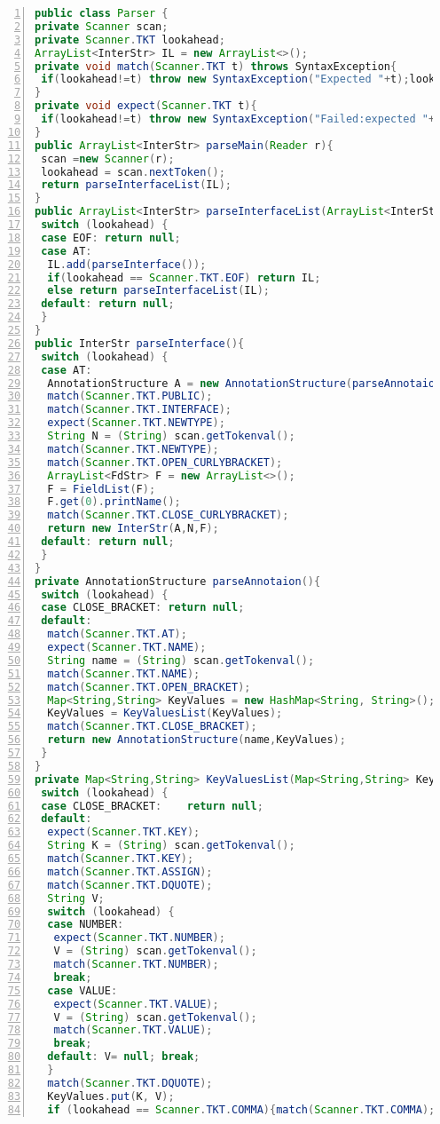 \documentclass[10pt]{report}
\begin{document}
\label{ParserClass}
\begin{lstlisting}[numbers=left,language=Java,frame=single,breaklines=true,label=Code:Mutual, caption=Parser Class.]
public class Parser {
private Scanner scan;
private Scanner.TKT lookahead;
ArrayList<InterStr> IL = new ArrayList<>();	
private void match(Scanner.TKT t) throws SyntaxException{
 if(lookahead!=t) throw new SyntaxException("Expected "+t);lookahead=scan.nextToken();
}
private void expect(Scanner.TKT t){
 if(lookahead!=t) throw new SyntaxException("Failed:expected "+t);
}
public ArrayList<InterStr> parseMain(Reader r){
 scan =new Scanner(r);
 lookahead = scan.nextToken();	
 return parseInterfaceList(IL);
}
public ArrayList<InterStr> parseInterfaceList(ArrayList<InterStr> IL){
 switch (lookahead) {
 case EOF: return null;
 case AT:
  IL.add(parseInterface());
  if(lookahead == Scanner.TKT.EOF) return IL;
  else return parseInterfaceList(IL);
 default: return null;
 }
}
public InterStr parseInterface(){
 switch (lookahead) {
 case AT:
  AnnotationStructure A = new AnnotationStructure(parseAnnotaion());
  match(Scanner.TKT.PUBLIC);
  match(Scanner.TKT.INTERFACE);
  expect(Scanner.TKT.NEWTYPE);
  String N = (String) scan.getTokenval();
  match(Scanner.TKT.NEWTYPE);
  match(Scanner.TKT.OPEN_CURLYBRACKET);
  ArrayList<FdStr> F = new ArrayList<>();
  F = FieldList(F);
  F.get(0).printName();
  match(Scanner.TKT.CLOSE_CURLYBRACKET);
  return new InterStr(A,N,F);
 default: return null;
 }
}
private AnnotationStructure parseAnnotaion(){
 switch (lookahead) {
 case CLOSE_BRACKET: return null;
 default:
  match(Scanner.TKT.AT); 
  expect(Scanner.TKT.NAME); 
  String name = (String) scan.getTokenval();
  match(Scanner.TKT.NAME);
  match(Scanner.TKT.OPEN_BRACKET);
  Map<String,String> KeyValues = new HashMap<String, String>();
  KeyValues = KeyValuesList(KeyValues);
  match(Scanner.TKT.CLOSE_BRACKET);
  return new AnnotationStructure(name,KeyValues);
 }
}
private Map<String,String> KeyValuesList(Map<String,String> KeyValues){
 switch (lookahead) {
 case CLOSE_BRACKET:	return null;
 default:
  expect(Scanner.TKT.KEY);
  String K = (String) scan.getTokenval();
  match(Scanner.TKT.KEY);
  match(Scanner.TKT.ASSIGN);
  match(Scanner.TKT.DQUOTE);
  String V;
  switch (lookahead) {
  case NUMBER:
   expect(Scanner.TKT.NUMBER);
   V = (String) scan.getTokenval();
   match(Scanner.TKT.NUMBER);
   break;
  case VALUE:
   expect(Scanner.TKT.VALUE);
   V = (String) scan.getTokenval();
   match(Scanner.TKT.VALUE);
   break;
  default: V= null; break;
  }
  match(Scanner.TKT.DQUOTE);
  KeyValues.put(K, V);
  if (lookahead == Scanner.TKT.COMMA){match(Scanner.TKT.COMMA);  

\end{lstlisting}
\end{document}
